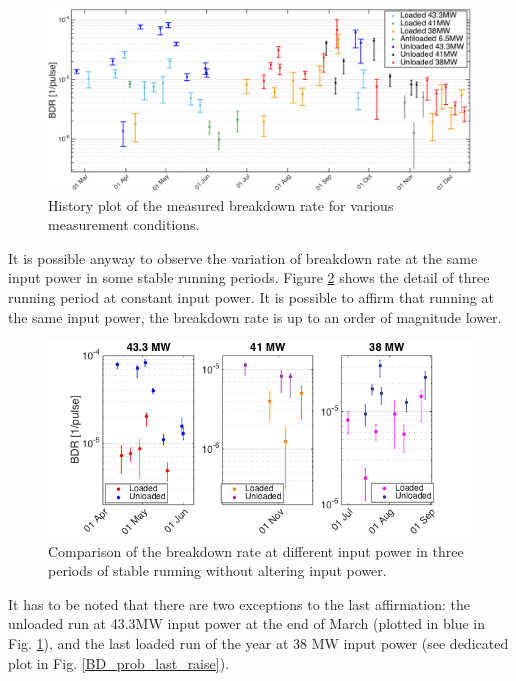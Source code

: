 \begin{landscape}

\begin{figure}[p]
\centering 
\includegraphics[scale=0.61]{pictures/bdr_hist_2.png}
\caption{History plot of the measured breakdown rate for various measurement conditions.}
\label{BDR_history}
\end{figure}
 
\end{landscape}

It is possible anyway to observe the variation of breakdown rate at the same input power in some stable running periods. Figure \ref{BD_prob} shows the detail of three running period at constant input power. It is possible to affirm that running at the same input power, the breakdown rate is up to an order of magnitude lower. 


\begin{figure}[h]
\centering 
\includegraphics[scale=0.5]{pictures/BDR_zooms.png}
\caption{Comparison of the breakdown rate at different input power in three periods of stable running without altering input power.}
\label{BD_prob}
\end{figure}

It has to be noted that there are two exceptions to the last affirmation: the unloaded run at 43.3MW input power at the end of March (plotted in blue in Fig. \ref{BDR_history}), and the last loaded run of the year at 38 MW input power (see dedicated plot in Fig. \ref{BD_prob_last_raise}). 

